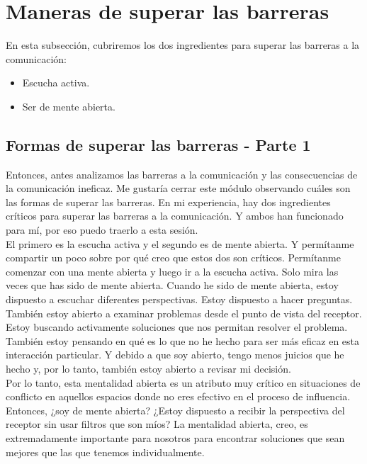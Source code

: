 \documentclass[10pt]{book}
\begin{document}
\section{Maneras de superar las barreras}
En esta subsección, cubriremos los dos ingredientes para superar las barreras a la comunicación:
\begin{itemize}
\item Escucha activa.
\item Ser de mente abierta.
\end{itemize}
\subsection{Formas de superar las barreras - Parte 1}
Entonces, antes analizamos las barreras a la comunicación y las consecuencias de la comunicación ineficaz. Me gustaría cerrar este módulo observando cuáles son las formas de superar las barreras. En mi experiencia, hay dos ingredientes críticos para superar las barreras a la comunicación. Y ambos han funcionado para mí, por eso puedo traerlo a esta sesión.\\
El primero es la escucha activa y el segundo es de mente abierta. Y permítanme compartir un poco sobre por qué creo que estos dos son críticos. Permítanme comenzar con una mente abierta y luego ir a la escucha activa. Solo mira las veces que has sido de mente abierta. Cuando he sido de mente abierta, estoy dispuesto a escuchar diferentes perspectivas. Estoy dispuesto a hacer preguntas. También estoy abierto a examinar problemas desde el punto de vista del receptor. Estoy buscando activamente soluciones que nos permitan resolver el problema. También estoy pensando en qué es lo que no he hecho para ser más eficaz en esta interacción particular. Y debido a que soy abierto, tengo menos juicios que he hecho y, por lo tanto, también estoy abierto a revisar mi decisión.\\
Por lo tanto, esta mentalidad abierta es un atributo muy crítico en situaciones de conflicto en aquellos espacios donde no eres efectivo en el proceso de influencia. Entonces, ¿soy de mente abierta? ¿Estoy dispuesto a recibir la perspectiva del receptor sin usar filtros que son míos? La mentalidad abierta, creo, es extremadamente importante para nosotros para encontrar soluciones que sean mejores que las que tenemos individualmente.
\end{document}
